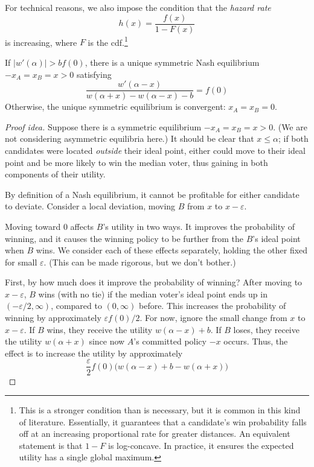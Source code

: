 \documentclass[../../../main.tex]{subfiles}
\begin{document}
\begin{definition}
    For technical reasons, we also impose the condition that the \textit{hazard rate}
    \begin{equation*}
        h(x)=\frac{f(x)}{1-F(x)}
    \end{equation*}
    is increasing, where $F$ is the cdf.\footnote{This is a stronger condition than is necessary, but it is common in this kind of literature. Essentially, it guarantees that a candidate's win probability falls off at an increasing proportional rate for greater distances. An equivalent statement is that $1-F$ is log-concave. In practice, it ensures the expected utility has a single global maximum.}
\end{definition}

\begin{theorem}
    If $|w'(\alpha)|>bf(0)$, there is a unique symmetric Nash equilibrium $-x_A=x_B=x>0$ satisfying
    \begin{equation}\label{equation:calvert_wittman_foc}
        \frac{w'(\alpha-x)}{w(\alpha+x)-w(\alpha-x)-b}=f(0)
    \end{equation}
    Otherwise, the unique symmetric equilibrium is convergent: $x_A=x_B=0$.
    \begin{proof}[Proof idea]
        Suppose there is a symmetric equilibrium $-x_A=x_B=x>0$. 
        (We are not considering asymmetric equilibria here.)
        It should be clear that $x\leq \alpha$; if both candidates were located \textit{outside} their ideal point, either could move to their ideal point and be more likely to win the median voter, thus gaining in both components of their utility.

        By definition of a Nash equilibrium, it cannot be profitable for either candidate to deviate.
        Consider a local deviation, moving $B$ from $x$ to $x-\varepsilon$.
        
        Moving toward 0 affects $B$'s utility in two ways. It improves the probability of winning, and it causes the winning policy to be further from the $B$'s ideal point when $B$ wins.
        We consider each of these effects separately, holding the other fixed for small $\varepsilon$. 
        (This can be made rigorous, but we don't bother.)

        First, by how much does it improve the probability of winning?
        After moving to $x-\varepsilon$, $B$ wins (with no tie) if the median voter's ideal point ends up in $(-\varepsilon/2,\infty)$, compared to $(0,\infty)$ before.
        This increases the probability of winning by approximately $\varepsilon f(0)/2$.
        For now, ignore the small change from $x$ to $x-\varepsilon$. If $B$ wins, they receive the utility $w(\alpha-x)+b$. If $B$ loses, they receive the utility $w(\alpha+x)$ since now $A$'s committed policy $-x$ occurs.
        Thus, the effect is to increase the utility by approximately
        \begin{equation*}
            \frac{\varepsilon}{2}f(0)\bigl(w(\alpha-x)+b-w(\alpha+x)\bigr)
        \end{equation*}


\end{proof}
\end{theorem}
\end{document}
